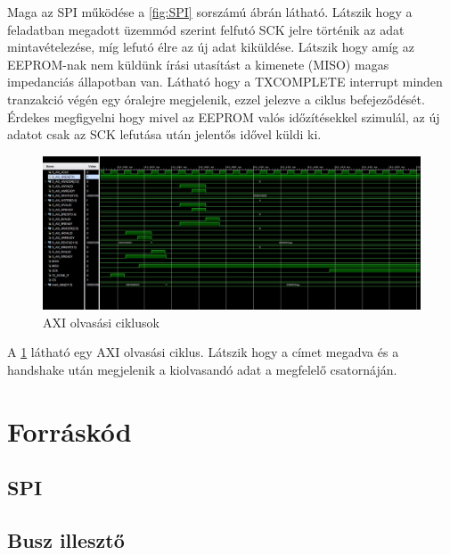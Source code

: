 \documentclass[a4paper,11pt]{article}
\begin{document}
Maga az SPI működése a \ref{fig:SPI} sorszámú ábrán látható. Látszik hogy a feladatban megadott üzemmód szerint felfutó SCK jelre történik az adat mintavételezése, míg lefutó élre az új adat kiküldése. Látszik hogy amíg az EEPROM-nak nem küldünk írási utasítást a kimenete (MISO) magas impedanciás állapotban van. Látható hogy a TXCOMPLETE interrupt minden tranzakció végén egy óralejre megjelenik, ezzel jelezve a ciklus befejeződését. Érdekes megfigyelni hogy mivel az EEPROM valós időzítésekkel szimulál, az új adatot csak az SCK lefutása után jelentős idővel küldi ki.

\begin{figure}[H]
	\begin{center}
	\includegraphics[scale=0.49]{axi_read.JPG}
	\caption{AXI olvasási ciklusok}
	\label{fig:axi_read}
	\end{center}
	
\end{figure}

A \ref{fig:axi_read} látható egy AXI olvasási ciklus. Látszik hogy a címet megadva és a handshake után megjelenik a kiolvasandó adat a megfelelő csatornáján.

\section{Forráskód}

\subsection{SPI}



\subsection{Busz illesztő}
\end{document}
